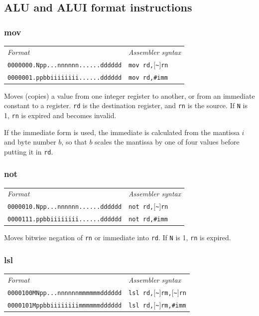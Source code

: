 \subsection{ALU and ALUI format instructions}

\newcommand{\decfmt}{
\begin{tabular}{ll}
\textit{Format} & \textit{Assembler syntax} \\[0.5ex]
}

\newcommand{\finfmt}{
\end{tabular}
}

\newcommand{\nex}[1]{$[$\textasciitilde$]$\texttt{#1}}

\subsubsection{mov}

\decfmt
\texttt{0000000.Npp...nnnnnn......dddddd} & \texttt{mov rd,\nex{rn}}\\
\texttt{0000001.ppbbiiiiiiii......dddddd} & \texttt{mov rd,\#imm}
\finfmt

Moves (copies) a value from one integer register to another, or from an immediate constant to a register. \texttt{rd} is the destination register, and \texttt{rn} is the source. If \texttt{N} is 1, \texttt{rn} is expired and becomes invalid.

If the immediate form is used, the immediate is calculated from the mantissa $i$ and byte number $b$, so that $b$ scales the mantissa by one of four values before putting it in \texttt{rd}.

\subsubsection{not}

\decfmt
\texttt{0000010.Npp...nnnnnn......dddddd} & \texttt{not rd,\nex{rn}}\\
\texttt{0000111.ppbbiiiiiiii......dddddd} & \texttt{not rd,\#imm}
\finfmt

Moves bitwise negation of \texttt{rn} or immediate into \texttt{rd}. If \texttt{N} is 1, \texttt{rn} is expired.

\subsubsection{lsl}

\decfmt
\texttt{0000100MNpp...nnnnnnmmmmmmdddddd} & \texttt{lsl rd,\nex{rm},\nex{rn}} \\
\texttt{0000101Mppbbiiiiiiiimmmmmmdddddd} & \texttt{lsl rd,\nex{rm},\#imm}
\finfmt


